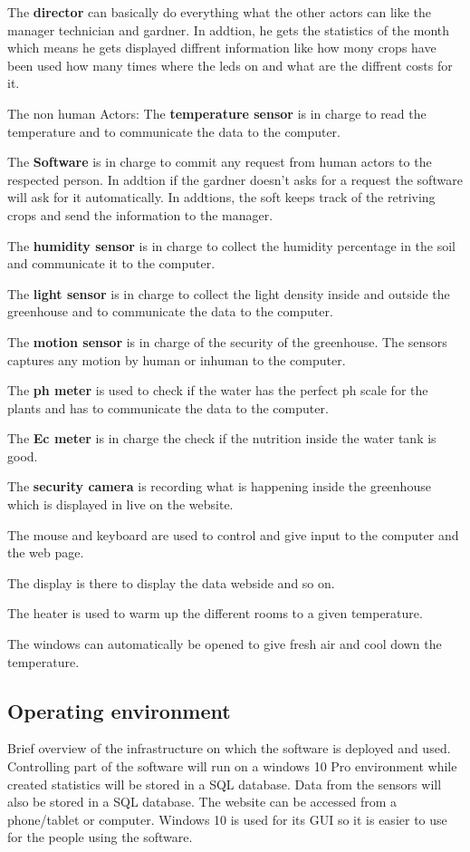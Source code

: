 \noindent The \textbf{director} can basically do everything what the
other actors can like the manager technician and gardner. In addtion, he
gets the statistics of the month which means he gets displayed diffrent
information like how mony crops have been used how many times where the
leds on and what are the diffrent costs for it.\break

\noindent The non human Actors:\hfill \break
The \textbf{temperature sensor} is in charge to read the temperature and to
communicate the data to the computer.

\noindent The \textbf{Software} is in charge to commit any request from human
actors to the respected person. In addtion if the gardner doesn't asks for a
request the software will ask for it automatically. In addtions, the soft keeps
track of the retriving crops and send the information to the manager.

\noindent The \textbf{humidity sensor} is in charge to collect the humidity
percentage in the soil and communicate it to the computer.

\noindent The \textbf{light sensor} is in charge to collect the light density
 inside and outside the greenhouse and to communicate the data to the
 computer.

\noindent The \textbf{motion sensor} is  in charge of the security of the
greenhouse. The sensors captures any motion by human or inhuman to the
computer.


\noindent The \textbf{ph meter} is used to check if the water has the perfect ph
scale for the plants and has to communicate the data to the computer.

\noindent The \textbf{Ec meter} is in charge the check if the nutrition inside
the water tank is good.

\noindent The \textbf{security camera} is recording what is happening inside the
greenhouse which is displayed in live on the website.

\noindent The mouse and keyboard are used to control and give input to the
computer and the web page.

\noindent The display is there to display the data webside and so on. 

\noindent The heater is used to warm up the different rooms to a given
temperature.

\noindent The windows can automatically be opened to give fresh air and cool
down the temperature.


\subsection{Operating environment}
Brief overview of the infrastructure on which the software is deployed and used.
Controlling part of the software will run on a windows 10 Pro environment while
created statistics will be stored in a SQL database. Data from the sensors will
also be stored in a SQL database. The website can be accessed from a
phone/tablet or computer. Windows 10 is used for its GUI so it is easier to use
for the people using the software.

